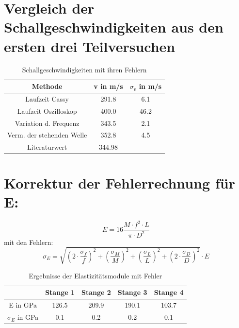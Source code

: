 \documentclass[12pt,a4paper]{article}
\begin{document}
\section{Vergleich der Schallgeschwindigkeiten aus den ersten drei Teilversuchen}
\begin{table}[H]
\caption{Schallgeschwindigkeiten mit ihren Fehlern}
\centering
\begin{tabular}{|c|c|c|}
\hline 
Methode & v in m/s & $\sigma_v$ in m/s \\ 
\hline 
Laufzeit Cassy & 291.8 & 6.1 \\ 
\hline 
Laufzeit Oszilloskop & 400.0 & 46.2 \\ 
\hline 
Variation d. Frequenz & 343.5 & 2.1 \\ 
\hline 
Verm. der stehenden Welle & 352.8 & 4.5 \\ 
\hline 
Literaturwert & 344.98 &  \\ 
\hline 
\end{tabular} 
\end{table}

\section{Korrektur der Fehlerrechnung für E:}
\begin{equation}
E=16 \frac{M\cdot f^2\cdot L}{\pi\cdot D^2}
\end{equation}
mit den Fehlern:
\begin{equation}
\sigma_{E}=\sqrt{(2\cdot\frac{\sigma_{f}}{f})^2+(\frac{\sigma_M}{M})^2+(\frac{\sigma_L}{L})^2+(2\cdot \frac{\sigma_D}{D})^2}\cdot E
\end{equation}

\begin{table}[H]\centering
\caption{Ergebnisse der Elastizitätsmodule mit Fehler}
\begin{tabular}{c|cccc}
 & Stange 1 & Stange 2 & Stange 3 & Stange 4 \\
\hline 
E in GPa & 126.5 & 209.9 & 190.1 & 103.7 \\ 
$\sigma_E$ in GPa & 0.1 & 0.2 & 0.2 & 0.1 \\ 
\end{tabular} 
\end{table}
\end{document}
